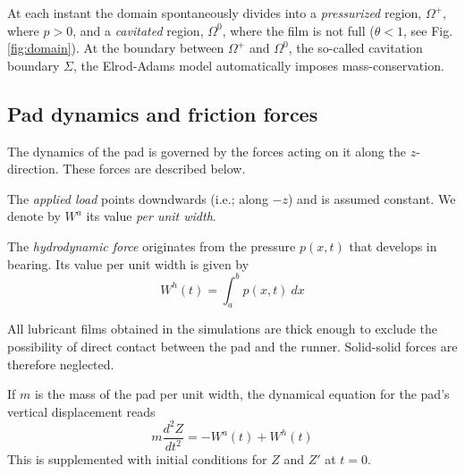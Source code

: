 At each instant the domain
spontaneously divides into a {\em pressurized} region, $\Omega^+$, where
$p>0$, and a {\em cavitated} region, $\Omega^0$, where the film is not
full ($\theta < 1$, see Fig. \ref{fig:domain}). At the boundary between $\Omega^+$ and
$\Omega^0$, the so-called cavitation boundary $\Sigma$, the
Elrod-Adams model automatically imposes mass-conservation.

\subsection{Pad dynamics and friction forces}

The dynamics of the pad is governed by the forces acting on it
along the $z$-direction. These forces are described below.

The {\em applied load} points downdwards (i.e.; along $-z$) and is 
assumed constant.
We denote by $W^{a}$ its value {\em per unit width}.

The {\em hydrodynamic force} originates from the pressure 
$p(x,t)$ that
develops in bearing. Its
value per unit width is given by
\begin{equation}
W^{h}(t)=\int_a^{b} p(x,t)~dx
\end{equation}

All lubricant films obtained 
in the simulations are thick enough to exclude the possibility of direct
contact between the pad and the runner.
Solid-solid forces are therefore neglected.

If $m$ is the mass of the pad per unit
width, the dynamical equation for the pad's vertical 
displacement reads
\begin{equation}
m \frac{d^2Z}{dt^2}  =  -W^{a}(t)+W^{h}(t)
\label{eqdynamics}
\end{equation}
This is supplemented with initial conditions for
$Z$ and $Z'$ at $t=0$. 

